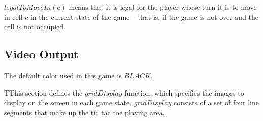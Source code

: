 \documentclass{../lib}
\begin{document}
\begin{ledCmnt}
$legalToMoveIn(c)$ means that it is legal for the player whose turn it is to move in cell $c$ in the current state of the game -- that is, if the game is not over and the cell is not occupied.
\end{ledCmnt}

\begin{ledDef}
\end{ledDef}

\begin{ledCmnt}
\section{Video Output}

The default color used in this game is $BLACK$.
\end{ledCmnt}

\begin{ledDef}
\end{ledDef}

\begin{ledDef}
\end{ledDef}

\begin{ledDef}
\end{ledDef}

\begin{ledDef}
\end{ledDef}

\begin{ledDef}
\end{ledDef}

\begin{ledCmnt}
TThis section defines the $gridDisplay$ function, which specifies the images to display on the screen in each game state. $gridDisplay$ consists of a set of four line segments that make up the tic tac toe playing area.
\end{ledCmnt}

\begin{ledDef}
\end{ledDef}
\end{document}
